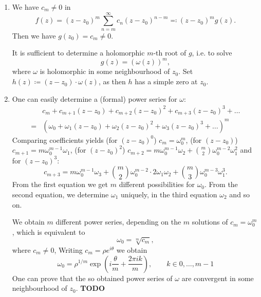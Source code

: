 \documentclass[a4paper,english]{article}
\begin{document}
\begin{pr}
    \begin{enumerate}
        \item 
        We have $c_m \ne 0$ in 
        \begin{equation*}
            f(z)
            = (z - z_0)^m \sum_{n = m}^{\infty} c_n (z - z_0)^{n - m}
            \eqqcolon (z - z_0)^m g(z). 
        \end{equation*}
        Then we have $g(z_0) = c_m \ne 0$.
        
        It is sufficient to determine a holomorphic $m$-th root of $g$, i.e. to solve
        \begin{equation*}
            g(z)
            = (\omega(z))^m,
        \end{equation*}
        where $\omega$ is holomorphic in some neighbourhood of $z_0$.
        Set $h(z) \coloneqq (z - z_0) \cdot \omega(z)$, as then $h$ has a simple zero at $z_0$.
        
        
        \item
        One can easily determine a (formal) power series for $\omega$:
        \begin{align*}
            & c_m + c_{m + 1}(z - z_0) + c_{m + 2} (z - z_0)^2 + c_{m + 3} (z - z_0)^3 + \ldots \\
            = & \left(\omega_0 + \omega_1 (z - z_0) + \omega_2 (z - z_0)^2 + \omega_3 (z - z_0)^3 + \ldots\right)^m
        \end{align*}
        Comparing coefficients yields (for $(z - z_0)^0$) $c_m = \omega_0^m$, (for $(z - z_0)$) $c_{m + 1} = m \omega_0^{m - 1} \omega_1$, (for $(z - z_0)^2$) $c_{m + 2} = m \omega_0^{m - 1} \omega_2 + \binom{m}{2} \omega_0^{m - 2} \omega_1^2$ and for $(z - z_0)^3$:
        \begin{equation*}
            c_{m + 3}
            = m \omega_0^{m - 1} \omega_3 + \binom{m}{2} \omega_0^{m - 2} \cdot 2 \omega_1 \omega_2 + \binom{m}{3} \omega_0^{m - 3} \omega_1^3.
        \end{equation*}
        From the first equation we get $m$ different possibilities for $\omega_0$.
        From the second equation, we determine $\omega_1$ uniquely, in the third equation $\omega_2$ and so on.
        
        We obtain $m$ different power series, depending on the $m$ solutions of $c_m = \omega_0^m$, which is equivalent to
        \begin{equation*}
            \omega_0
            = \sqrt[m]{c_m},
        \end{equation*}
        where $c_m \ne 0$,
        Writing $c_m = \rho e^{i \theta}$ we obtain
        \begin{equation*}
            \omega_0
            = \rho^{1/m} \exp\left( i \frac{\theta}{m} + \frac{2 \pi i k}{m}\right), \qquad
            k \in {0, \ldots, m - 1}
        \end{equation*}
        One can prove that the so obtained power series of $\omega$ are convergent in some neighbourhood of $z_0$. \textbf{TODO}
        

\end{enumerate}
\end{pr}
\end{document}
